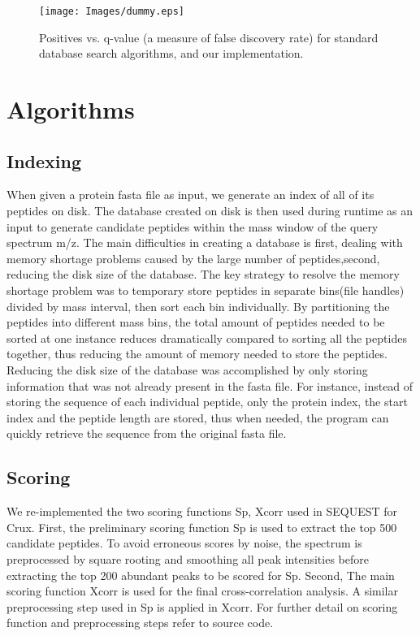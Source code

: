 \documentclass{bioinfo}
\begin{document}
\begin{figure}
  \centering
  \texttt{[image: Images/dummy.eps]}
  \caption{Positives vs. q-value (a measure of false discovery rate) for
  standard database search algorithms, and our implementation.}
  \label{figure:indexing}
\end{figure}



\section{Algorithms}

\subsection*{Indexing}
When given a protein fasta file as input, we generate an index of all of its peptides on disk. The database created on disk is then used during runtime as an input to generate candidate peptides within the mass window of the query spectrum m/z. The main difficulties in creating a database is first, dealing with memory shortage problems caused by the large number of peptides,second, reducing the disk size of the database. The key strategy to resolve the memory shortage problem was to temporary store peptides in separate bins(file handles) divided by mass interval, then sort each bin individually. By partitioning the peptides into different mass bins, the total amount of peptides needed to be sorted at one instance reduces dramatically compared to sorting all the peptides together, thus reducing the amount of memory needed to store the peptides. Reducing the disk size of the database was accomplished by only storing information that was not already present in the fasta file. For instance, instead of storing the sequence of each individual peptide, only the protein index, the start index and the peptide length are stored, thus when needed, the program can quickly retrieve the sequence from the original fasta file.

\subsection*{Scoring}
We re-implemented the two scoring functions Sp, Xcorr  used in SEQUEST for Crux.  First, the preliminary scoring function Sp is used to extract the top 500 candidate peptides. To avoid erroneous scores by noise, the spectrum is preprocessed by square rooting and smoothing all peak intensities before extracting the top 200 abundant peaks to be scored for Sp. 
Second, The main scoring function Xcorr is used for the final cross-correlation analysis. A similar preprocessing step used in Sp is applied in Xcorr. For further detail on scoring function and preprocessing steps refer to source code.
\end{document}
